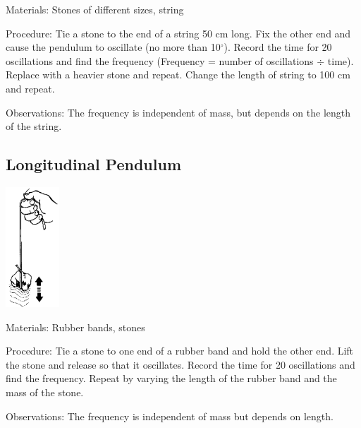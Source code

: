 \begin{multicols}{2}
\begin{description*}
\item[Materials:]{Stones of different sizes, string}
\item[Procedure:]{Tie a stone to the end of a string 50 cm long. Fix the other end and cause the pendulum to oscillate (no more than 10$^\circ$). Record the time for 20 oscillations and find the frequency (Frequency = number of oscillations $\div$ time). Replace with a heavier stone and repeat. Change the length of string to 100 cm and repeat.}
\item[Observations:]{The frequency is independent of mass, but depends on the length of the string.}
\end{description*}

\subsection{Longitudinal Pendulum} 

\begin{center}
\includegraphics[width=0.15\textwidth]{./img/source/longitudinal-pendulum.png}
\end{center}

\begin{description*}
\item[Materials:]{Rubber bands, stones}
\item[Procedure:]{Tie a stone to one end of a rubber band and hold the other end. Lift the stone and release so that it oscillates. Record the time for 20 oscillations and find the frequency. Repeat by varying the length of the rubber band and the mass of the stone.}
\item[Observations:]{The frequency is independent of mass but depends on length.}
\end{description*}


\end{multicols}
